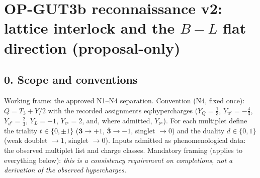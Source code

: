 \section*{OP-GUT3b reconnaissance v2: lattice interlock and the
$B{-}L$ flat direction (proposal-only)}

\subsection*{0. Scope and conventions}
Working frame: the approved N1--N4 separation.
Convention (N4, fixed once): $Q=T_3+Y/2$ with the recorded
assignments eq:hypercharges
($Y_Q=\tfrac13$, $Y_{u^c}=-\tfrac43$, $Y_{d^c}=\tfrac23$,
$Y_L=-1$, $Y_{e^c}=2$, and, where admitted, $Y_{\nu^c}$).
For each multiplet define the triality $t\in\{0,\pm1\}$
($\mathbf3\to+1$, $\bar{\mathbf3}\to-1$, singlet $\to0$) and the
duality $d\in\{0,1\}$ (weak doublet $\to1$, singlet $\to0$).
Inputs admitted as phenomenological data: the observed multiplet
list and charge classes.
Mandatory framing (applies to everything below):
\emph{this is a consistency requirement on completions, not a
derivation of the observed hypercharges.}

